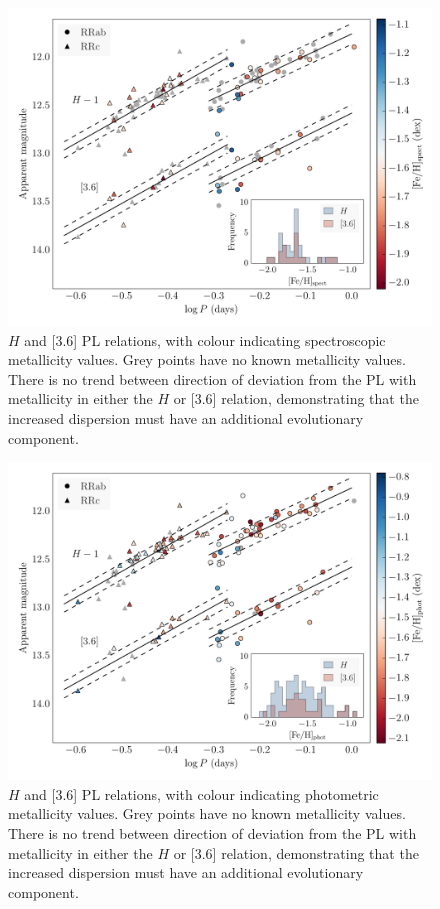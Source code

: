 \documentclass[a4paper,fleqn,usenatbib]{mnras}
\begin{document}
\begin{figure}
\begin{center}
\includegraphics[width=160mm]{reworked_fitting_code/final_plots/spect_color_PL.pdf}
\caption{$H$ and [3.6] PL relations, with colour indicating spectroscopic \citep{2006ApJ...640L..43S} metallicity values. Grey points have no known metallicity values. There is no trend between direction of deviation from the PL with metallicity in either the $H$ or [3.6] relation, demonstrating that the increased dispersion must have an additional evolutionary component.}
\label{fig:hband_spectro}
\end{center}
\end{figure}

\begin{figure}
\begin{center}
\includegraphics[width=160mm]{reworked_fitting_code/final_plots/phot_color_PL.pdf}
\caption{$H$ and [3.6] PL relations, with colour indicating photometric \citep{2000AJ....119.1824R} metallicity values. Grey points have no known metallicity values. There is no trend between direction of deviation from the PL with metallicity in either the $H$ or [3.6] relation, demonstrating that the increased dispersion must have an additional evolutionary component.}
\label{fig:hband_photo}
\end{center}
\end{figure}
\end{document}
